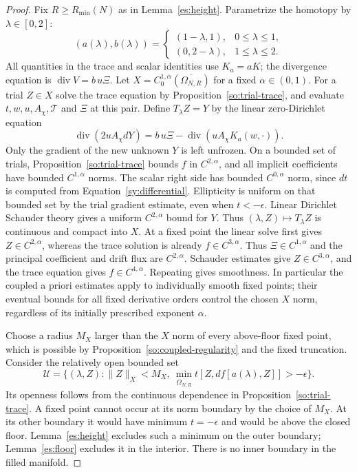 \begin{proof}
Fix $R\ge R_{\min}(N)$ as in Lemma~\ref{es:height}.  Parametrize the
homotopy by $\lambda\in[0,2]$:
\[
 (a(\lambda),b(\lambda))=
 \begin{cases}(1-\lambda,1),&0\le\lambda\le1,\\
               (0,2-\lambda),&1\le\lambda\le2.
 \end{cases}
\]
All quantities in the trace and scalar identities use $K_a=aK$;
the divergence equation is $\operatorname{div}V=b\,u\Xi$.
Let $X=C^{1,\alpha}_0(\overline{\Omega_{N,R}})$ for a fixed
$\alpha\in(0,1)$.  For a trial $Z\in X$ solve the trace equation by
Proposition~\ref{so:trial-trace}, and evaluate $t,w,u,A_\chi,\mathcal T$
and $\Xi$ at this pair.  Define $T_\lambda Z=Y$ by the linear
zero-Dirichlet equation
\begin{equation}\label{so:compact-map}
 \operatorname{div}(2uA_\chi dY)
       =b\,u\Xi-\operatorname{div}(uA_\chi K_a(w,\cdot)).
\end{equation}
Only the gradient of the new unknown $Y$ is left unfrozen.
On a bounded set of trials, Proposition~\ref{so:trial-trace} bounds
$f$ in $C^{2,\alpha}$, and all implicit coefficients have bounded
$C^{1,\alpha}$ norms.  The scalar right side has bounded
$C^{0,\alpha}$ norm, since $dt$ is computed from
Equation~\ref{sy:differential}.  Ellipticity is uniform on that bounded
set by the trial gradient estimate, even when $t<-\epsilon$.
Linear Dirichlet Schauder theory gives a uniform $C^{2,\alpha}$ bound
for $Y$.  Thus $(\lambda,Z)\mapsto T_\lambda Z$ is continuous and
compact into $X$.  At a fixed point the linear solve first gives
$Z\in C^{2,\alpha}$, whereas the trace solution is already
$f\in C^{3,\alpha}$.  Thus $\Xi\in C^{1,\alpha}$ and the principal
coefficient and drift flux are $C^{2,\alpha}$.  Schauder estimates give
$Z\in C^{3,\alpha}$, and the trace equation gives
$f\in C^{4,\alpha}$.  Repeating gives smoothness.  In particular the
coupled a priori estimates apply to individually smooth fixed points;
their eventual bounds for all fixed derivative orders control the
chosen $X$ norm, regardless of its initially prescribed exponent
$\alpha$.

Choose a radius $M_X$ larger than the $X$ norm of every above-floor
fixed point, which is possible by Proposition~\ref{so:coupled-regularity}
and the fixed truncation.  Consider the relatively open bounded set
\begin{equation}\label{so:moving-domain}
 \mathcal U=\{(\lambda,Z):\|Z\|_X<M_X,
       \ \min_{\overline{\Omega_{N,R}}}t[Z,df[a(\lambda),Z]]
                                                >-\epsilon\}.
\end{equation}
Its openness follows from the continuous dependence in
Proposition~\ref{so:trial-trace}.  A fixed point cannot occur at its
norm boundary by the choice of $M_X$.  At its other boundary it would
have minimum $t=-\epsilon$ and would be above the closed floor.
Lemma~\ref{es:height} excludes such a minimum on the outer boundary;
Lemma~\ref{es:floor} excludes it in the interior.  There is no
inner boundary in the filled manifold.


\end{proof}
